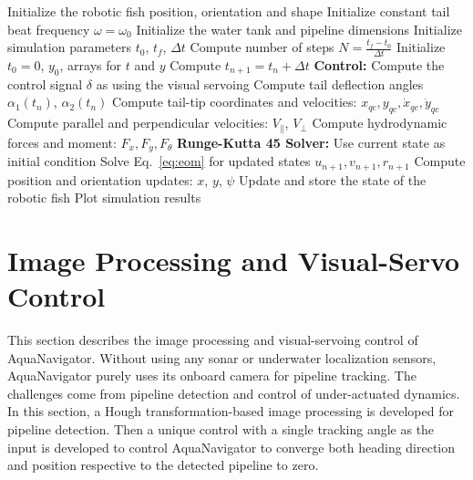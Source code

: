 \documentclass[pdflatex,sn-mathphys-num]{sn-jnl}
\theoremstyle{thmstyleone}%
\begin{document}
\begin{algorithm}[H]
    \caption{Simulator Algorithm}
    \label{alg:simulator}
    \begin{algorithmic}[1]
        \STATE Initialize the robotic fish position, orientation and shape
        \STATE Initialize constant tail beat frequency $\omega = \omega_0$
        \STATE Initialize the water tank and pipeline dimensions
        \STATE Initialize simulation parameters $t_0$, $t_f$, $\Delta t$
        \STATE Compute number of steps $N = \frac{t_f - t_0}{\Delta t}$
        \STATE Initialize $t_0 = 0$, $y_0$, arrays for $t$ and $y$
            \STATE Compute $t_{n+1} = t_n + \Delta t$
            \STATE \textbf{Control:} Compute the control signal $\delta$ as using the visual servoing
            \STATE Compute tail deflection angles $\alpha_1(t_n)$, $\alpha_2(t_n)$
            \STATE Compute tail-tip coordinates and velocities: $x_{qc}, y_{qc}, \dot{x}_{qc}, \dot{y}_{qc}$
            \STATE Compute parallel and perpendicular velocities: $V_\parallel$, $V_\perp$
            \STATE Compute hydrodynamic forces and moment: $F_x, F_y, F_\theta$
            \STATE \textbf{Runge-Kutta 45 Solver:}
            \STATE \hspace{1em} Use current state as initial condition
            \STATE \hspace{1em} Solve Eq.~\ref{eq:eom} for updated states $u_{n+1}, v_{n+1}, r_{n+1}$
            \STATE Compute position and orientation updates: $x$, $y$, $\psi$
            \STATE Update and store the state of the robotic fish
        \ENDFOR
        \STATE Plot simulation results
    \end{algorithmic}
\end{algorithm}
\section{Image Processing and Visual-Servo Control}\label{Visual_servoing}
\par This section describes the image processing and visual-servoing control of AquaNavigator. Without using any sonar or underwater localization sensors, AquaNavigator purely uses its onboard camera for pipeline tracking. The challenges come from pipeline detection and control of under-actuated dynamics. In this section, a Hough transformation-based image processing is developed for pipeline detection. Then a unique control with a single tracking angle as the input is developed to control AquaNavigator to converge both heading direction and position respective to the detected pipeline to zero. 
\end{document}
